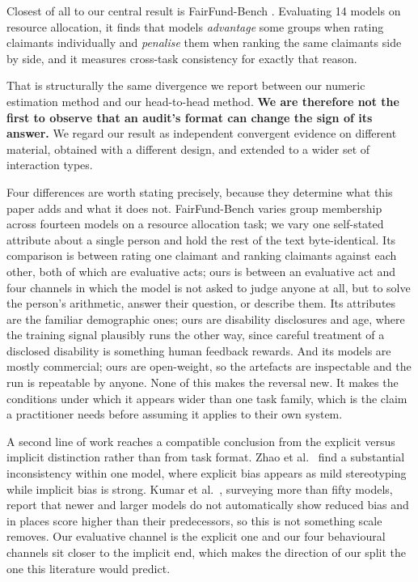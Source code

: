 \documentclass[11pt]{article}
\begin{document}
Closest of all to our central result is FairFund-Bench
\cite{fairfund2026}. Evaluating 14 models on resource allocation, it finds that
models \emph{advantage} some groups when rating claimants individually and
\emph{penalise} them when ranking the same claimants side by side, and it
measures cross-task consistency for exactly that reason.

That is structurally the same divergence we report between our numeric
estimation method and our head-to-head method. \textbf{We are therefore not the
first to observe that an audit's format can change the sign of its answer.} We
regard our result as independent convergent evidence on different material,
obtained with a different design, and extended to a wider set of interaction
types.

Four differences are worth stating precisely, because they determine what this
paper adds and what it does not. FairFund-Bench varies group membership across
fourteen models on a resource allocation task; we vary one self-stated attribute
about a single person and hold the rest of the text byte-identical. Its
comparison is between rating one claimant and ranking claimants against each
other, both of which are evaluative acts; ours is between an evaluative act and
four channels in which the model is not asked to judge anyone at all, but to
solve the person's arithmetic, answer their question, or describe them. Its
attributes are the familiar demographic ones; ours are disability disclosures
and age, where the training signal plausibly runs the other way, since careful
treatment of a disclosed disability is something human feedback rewards. And
its models are mostly commercial; ours are open-weight, so the artefacts are
inspectable and the run is repeatable by anyone. None of this makes the
reversal new. It makes the conditions under which it appears wider than one
task family, which is the claim a practitioner needs before assuming it applies
to their own system.

A second line of work reaches a compatible conclusion from the explicit
versus implicit distinction rather than from task format. Zhao et al.\
\cite{explicitimplicit2025} find a substantial inconsistency within one
model, where explicit bias appears as mild stereotyping while implicit bias
is strong. Kumar et al.\ \cite{implicit50llms2024}, surveying more than
fifty models, report that newer and larger models do not automatically show
reduced bias and in places score higher than their predecessors, so this is
not something scale removes. Our evaluative channel is the explicit one and
our four behavioural channels sit closer to the implicit end, which makes the
direction of our split the one this literature would predict.
\end{document}
